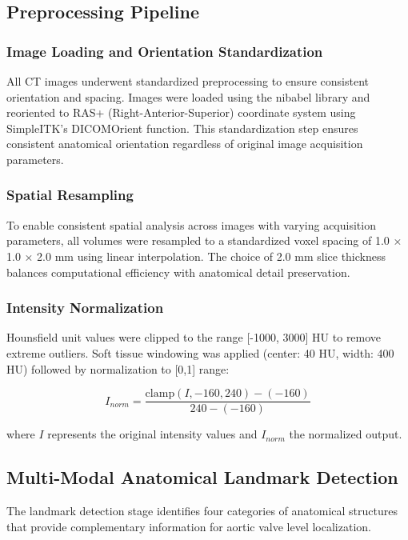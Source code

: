 \documentclass[11pt,a4paper]{article}
\begin{document}
\subsection{Preprocessing Pipeline}

\subsubsection{Image Loading and Orientation Standardization}
All CT images underwent standardized preprocessing to ensure consistent orientation and spacing. Images were loaded using the nibabel library and reoriented to RAS+ (Right-Anterior-Superior) coordinate system using SimpleITK's DICOMOrient function. This standardization step ensures consistent anatomical orientation regardless of original image acquisition parameters.

\subsubsection{Spatial Resampling}
To enable consistent spatial analysis across images with varying acquisition parameters, all volumes were resampled to a standardized voxel spacing of 1.0 × 1.0 × 2.0 mm using linear interpolation. The choice of 2.0 mm slice thickness balances computational efficiency with anatomical detail preservation.

\subsubsection{Intensity Normalization}
Hounsfield unit values were clipped to the range [-1000, 3000] HU to remove extreme outliers. Soft tissue windowing was applied (center: 40 HU, width: 400 HU) followed by normalization to [0,1] range:

\begin{equation}
I_{norm} = \frac{\text{clamp}(I, -160, 240) - (-160)}{240 - (-160)}
\end{equation}

where $I$ represents the original intensity values and $I_{norm}$ the normalized output.

\subsection{Multi-Modal Anatomical Landmark Detection}

The landmark detection stage identifies four categories of anatomical structures that provide complementary information for aortic valve level localization.
\end{document}

